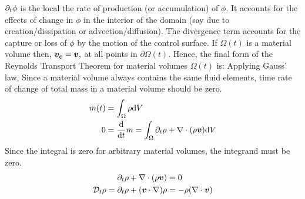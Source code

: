 $\partial_{t}\phi$ is the local the rate of production (or accumulation) of $\phi.$ It accounts for the effects of change in $\phi$ in the interior of the domain (say due to creation/dissipation or advection/diffusion). The divergence term accounts for the capture or loss of $\phi$ by the motion of the control surface. If $\Omega(t)$ is a material volume then, $\boldsymbol{v_c}=\boldsymbol{v},$ at all points in $\partial\Omega(t)$. Hence, the final form of the Reynolds Transport Theorem for material volumes $\Omega(t)$ is:
Applying Gauss' law,
Since a material volume always contains the same fluid elements, time rate of change of total mass in a material volume should be zero.
\begin{equation}
\begin{split}
    m(t) &= \int_{\Omega}\rho\mathrm{d} V \\
    0 &= \frac{\mathrm{d}}{\mathrm{d} t}m = \int_{\Omega}\partial_{t}\rho +
    \nabla\cdot(\rho\boldsymbol{v}) \mathrm{d} V
\end{split}
\end{equation}
Since the integral is zero for arbitrary material volumes, the integrand must be zero.
\begin{equation}
\begin{split}
    \partial_{t}\rho + \nabla\cdot(\rho\boldsymbol{v}) &= 0 \\
    \mathcal{D}_t\rho = \partial_{t}\rho + (\boldsymbol{v}\cdot\nabla)\rho &= -\rho(\nabla\cdot\boldsymbol{v})
\end{split}
\end{equation}

